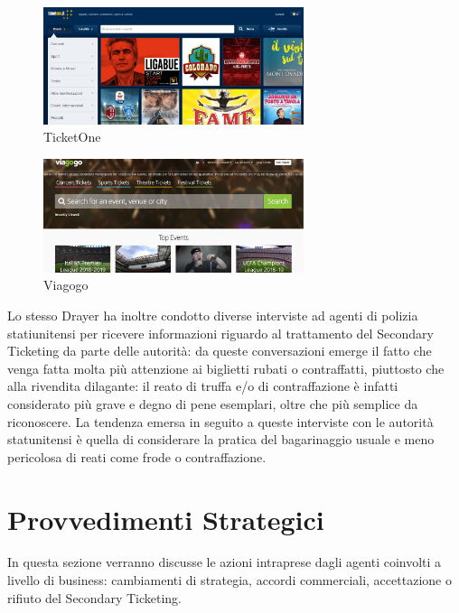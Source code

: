 \begin{figure}[htbp]
	\centering
	\includegraphics[width=0.68\textwidth]{chapter3/immagini/ticketone_1}
	\caption{TicketOne}
	\label{ticketone}
\end{figure}
\begin{figure}[htbp]
	\centering
	\includegraphics[width=0.68\textwidth]{chapter3/immagini/viagogo_disclaimer}
	\caption{Viagogo}
	\label{viagogo}
\end{figure}
Lo stesso Drayer ha inoltre condotto diverse interviste ad agenti di polizia statiunitensi per ricevere informazioni riguardo al trattamento del Secondary Ticketing da parte delle autorità: da queste conversazioni emerge il fatto che venga fatta molta più attenzione ai biglietti rubati o contraffatti, piuttosto che alla rivendita dilagante: il reato di truffa e/o di contraffazione è infatti considerato più grave e degno di pene esemplari, oltre che più semplice da riconoscere. La tendenza emersa in seguito a queste interviste con le autorità  statunitensi è quella di considerare la pratica del bagarinaggio usuale e meno pericolosa di reati come frode o contraffazione. 

\section{Provvedimenti Strategici} \label{sec:strat}
In questa sezione verranno discusse le azioni intraprese dagli agenti coinvolti a livello di business: cambiamenti di strategia, accordi commerciali, accettazione o rifiuto del Secondary Ticketing. 
